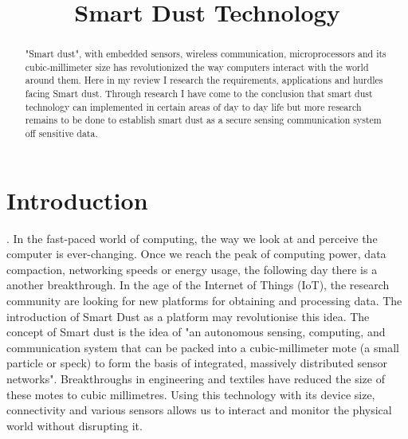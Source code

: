 \documentclass[article]{IEEEtran}
\begin{document}
\title{Smart Dust Technology }
\author
{
}

\maketitle

\begin{abstract}
"Smart dust", with embedded sensors, wireless communication, microprocessors and its cubic-millimeter size has revolutionized the way computers interact with the world around them. Here in my review I research the requirements, applications and hurdles facing Smart dust. Through research I have come to the conclusion that smart dust technology can implemented in certain areas of day to day life but more research remains to be done to establish smart dust as a secure sensing communication system off sensitive data. 
\end{abstract}


\section{Introduction}.\newline
In the fast-paced world of computing, the way we look at and perceive the computer is ever-changing. Once we reach the peak of computing power, data compaction, networking speeds or energy usage, the following day there is a another breakthrough. In the age of the Internet of Things (IoT)\cite{Lightweight}, the research community are looking for new platforms for obtaining and processing data. The introduction of Smart Dust as a platform may revolutionise this idea. 
The concept of Smart dust is the idea of  "an autonomous sensing, computing, and communication system that can be packed into a cubic-millimeter mote (a small particle or speck) to form the basis of integrated, massively distributed sensor networks"\cite{Mili}. Breakthroughs in engineering and textiles have reduced the size of these motes to cubic millimetres\cite{textiles}. Using this technology with its device size, connectivity and various sensors allows us to interact and monitor the physical world without disrupting it.\cite{MobNet}
\end{document}
